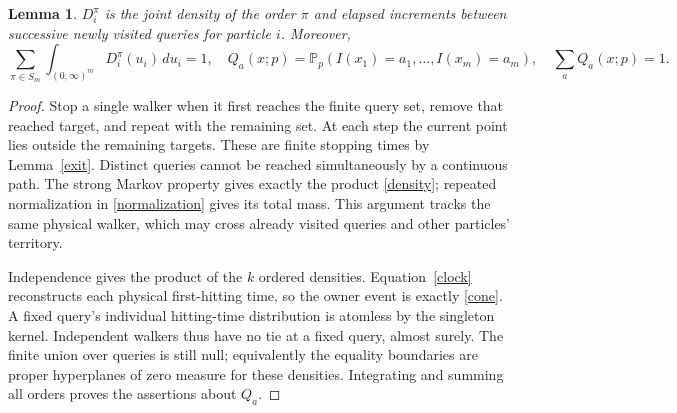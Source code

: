 \documentclass[11pt]{article}
\newtheorem{lemma}{Lemma}
\newcommand{\Prob}{\mathbb P}
\begin{document}
\begin{lemma}\label{finite}
$D_i^\pi$ is the joint density of the order $\pi$ and elapsed
increments between successive newly visited queries for particle $i$.
Moreover,
\[
 \sum_{\pi\in S_m}\int_{(0,\infty)^m}D_i^\pi(u_i)\,du_i=1,
 \quad Q_a(x;p)=\Prob_p(I(x_1)=a_1,\ldots,I(x_m)=a_m),
 \quad \sum_aQ_a(x;p)=1.
\]
\end{lemma}
\begin{proof}
Stop a single walker when it first reaches the finite query set, remove
that reached target, and repeat with the remaining set. At each step
the current point lies outside the remaining targets. These are finite
stopping times by Lemma~\ref{exit}. Distinct queries cannot be reached
simultaneously by a continuous path. The strong Markov property
\cite[Theorem~2.16]{MoertersPeres} gives exactly the product
\eqref{density}; repeated normalization in \eqref{normalization} gives
its total mass. This argument tracks the same physical walker, which
may cross already visited queries and other particles' territory.

Independence gives the product of the $k$ ordered densities.
Equation~\eqref{clock} reconstructs each physical first-hitting time,
so the owner event is exactly \eqref{cone}. A fixed query's individual
hitting-time distribution is atomless by the singleton kernel.
Independent walkers thus have no tie at a fixed query, almost surely.
The finite union over queries is still null; equivalently the equality
boundaries are proper hyperplanes of zero measure for these densities.
Integrating and summing all orders proves the assertions about $Q_a$.
\end{proof}
\end{document}
